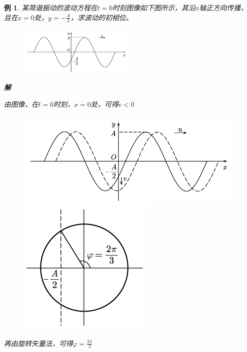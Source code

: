 \documentclass[12pt, a4paper, twoside]{ctexbook}
\newtheorem{example}[theorem]{例}
\begin{document}
\begin{example}
    某简谐振动的波动方程在$t=0$时刻图像如下图所示，其沿$x$轴正方向传播，且在$x=0$处，$y=-\frac{A}{2}$，求波动的初相位。
    \begin{figure}[H]
        \centerline{\includegraphics[width=0.5\textwidth]{CH04EX01.pdf}}
    \end{figure}

    \noindent\textbf{解}

    由图像，在$t=0$时刻，$x=0$处，可得$v<0$
    \begin{figure}[H]
        \centering
        \begin{minipage}{0.50\linewidth}
            \centering
            \includegraphics[width=1.0\linewidth]{CH04EX01SolveA.pdf}
        \end{minipage}
        \begin{minipage}{0.48\linewidth}
            \centering
            \includegraphics[width=0.44\linewidth]{CH04EX01SolveB.pdf}
        \end{minipage}
    \end{figure}
    再由旋转矢量法，可得$\varphi=\frac{2\pi}{3}$
\end{example}
\end{document}
